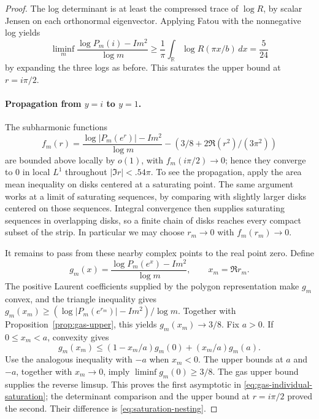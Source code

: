 \begin{proof}
The log determinant is at least the compressed trace of \(\log R\), by scalar Jensen on each orthonormal eigenvector. Applying Fatou with the nonnegative log yields
\[
 \liminf_m\frac{\log P_m(i)-I m^2}{\log m}
 \ge \frac1\pi\int_{\mathbb R}\log R(\pi x/b)\,dx
 =\frac5{24}
\]
by expanding the three logs as before. This saturates the upper bound at \(r=i\pi/2\).

\paragraph{Propagation from \(y=i\) to \(y=1\).}
The subharmonic functions
\[
 f_m(r)=\frac{\log|P_m(e^r)|-I m^2}{\log m}-\left(3/8+2\Re(r^2)/(3\pi^2)\right)
\]
are bounded above locally by \(o(1)\), with
\(f_m(i\pi/2)\to0\); hence they converge to 0 in local \(L^1\)
throughout \(|\Im r|<.54\pi\). To see the propagation, apply the area
mean inequality on disks centered at a saturating point. The same
argument works at a limit of saturating sequences, by comparing with
slightly larger disks centered on those sequences. Integral convergence
then supplies saturating sequences in overlapping disks, so a finite
chain of disks reaches every compact subset of the strip. In particular
we may choose \(r_m\to0\) with \(f_m(r_m)\to0\).

It remains to pass from these nearby complex points to the real point
zero. Define
\[
 g_m(x)=\frac{\log P_m(e^x)-Im^2}{\log m},\qquad x_m=\Re r_m.
\]
The positive Laurent coefficients supplied by the polygon representation
make \(g_m\) convex, and the triangle inequality gives
\(g_m(x_m)\ge(\log|P_m(e^{r_m})|-Im^2)/\log m\).
Together with Proposition~\ref{prop:gas-upper}, this yields
\(g_m(x_m)\to3/8\). Fix \(a>0\). If \(0\le x_m<a\), convexity
gives
\[
 g_m(x_m)\le(1-x_m/a)g_m(0)+(x_m/a)g_m(a).
\]
Use the analogous inequality with \(-a\) when \(x_m<0\). The upper
bounds at \(a\) and \(-a\), together with \(x_m\to0\), imply
\(\liminf g_m(0)\ge3/8\). The gas upper bound supplies the reverse
limsup. This proves the first asymptotic in
\eqref{eq:gas-individual-saturation}; the determinant comparison and the
upper bound at \(r=i\pi/2\) proved the second. Their difference is
\eqref{eq:saturation-nesting}.
\end{proof}
